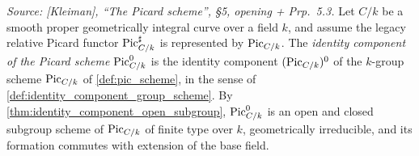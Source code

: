 \begin{definition}\leanok
  \label{def:pic_zero_subscheme}

  \textit{Source: [Kleiman], ``The Picard scheme'', \S 5, opening +
  Prp.~5.3.}
  Let \(C/k\) be a smooth proper geometrically integral curve over a field
  \(k\), and assume the legacy relative Picard functor
  \(\operatorname{Pic}^\sharp_{C/k}\) is represented by \(\operatorname{Pic}_{C/k}\). The
  \emph{identity component of the Picard scheme}
  \(\operatorname{Pic}^0_{C/k}\) is the identity component
  \((\operatorname{Pic}_{C/k})^0\) of the \(k\)-group scheme \(\operatorname{Pic}_{C/k}\) of
  \cref{def:pic_scheme}, in the sense of
  \cref{def:identity_component_group_scheme}. By
  \cref{thm:identity_component_open_subgroup}, \(\operatorname{Pic}^0_{C/k}\) is an open
  and closed subgroup scheme of \(\operatorname{Pic}_{C/k}\) of finite type over \(k\),
  geometrically irreducible, and its formation commutes with
  extension of the base field.
\end{definition}

